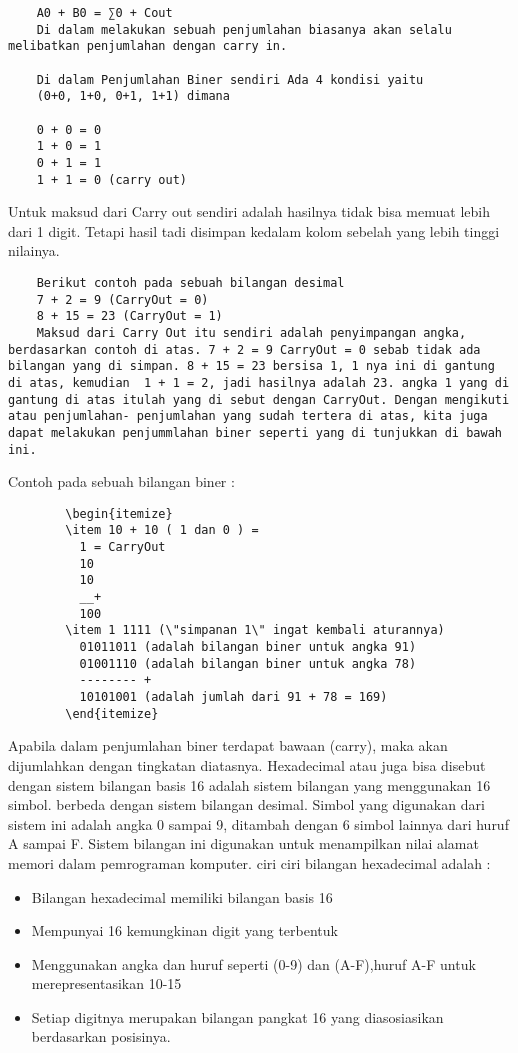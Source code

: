\begin{verbatim}
	A0 + B0 = ∑0 + Cout
	Di dalam melakukan sebuah penjumlahan biasanya akan selalu melibatkan penjumlahan dengan carry in.

	Di dalam Penjumlahan Biner sendiri Ada 4 kondisi yaitu
	(0+0, 1+0, 0+1, 1+1) dimana

	0 + 0 = 0
	1 + 0 = 1
	0 + 1 = 1
	1 + 1 = 0 (carry out) 
\end{verbatim}
	Untuk maksud dari Carry out sendiri adalah hasilnya tidak bisa memuat lebih dari 1 digit. Tetapi  hasil tadi disimpan kedalam kolom sebelah yang lebih tinggi nilainya.
\begin{verbatim}
	Berikut contoh pada sebuah bilangan desimal
	7 + 2 = 9 (CarryOut = 0)
	8 + 15 = 23 (CarryOut = 1)
	Maksud dari Carry Out itu sendiri adalah penyimpangan angka, berdasarkan contoh di atas. 7 + 2 = 9 CarryOut = 0 sebab tidak ada bilangan yang di simpan. 8 + 15 = 23 bersisa 1, 1 nya ini di gantung di atas, kemudian  1 + 1 = 2, jadi hasilnya adalah 23. angka 1 yang di gantung di atas itulah yang di sebut dengan CarryOut. Dengan mengikuti atau penjumlahan- penjumlahan yang sudah tertera di atas, kita juga dapat melakukan penjummlahan biner seperti yang di tunjukkan di bawah ini.
\end{verbatim}
	Contoh pada sebuah bilangan biner :
	\begin{verbatim}
		\begin{itemize}
		\item 10 + 10 ( 1 dan 0 ) =
		  1 = CarryOut
		  10
		  10
		  __+
		  100
		\item 1 1111 (\"simpanan 1\" ingat kembali aturannya)
		  01011011 (adalah bilangan biner untuk angka 91)
		  01001110 (adalah bilangan biner untuk angka 78)
		  -------- +
		  10101001 (adalah jumlah dari 91 + 78 = 169)
		\end{itemize}
	\end{verbatim}

	Apabila dalam penjumlahan biner terdapat bawaan (carry), maka akan dijumlahkan dengan tingkatan diatasnya.
	Hexadecimal atau juga bisa disebut dengan sistem bilangan basis 16 adalah sistem bilangan yang menggunakan 16 simbol. berbeda dengan sistem bilangan desimal. Simbol yang digunakan dari sistem ini adalah angka 0 sampai 9, ditambah dengan 6 simbol lainnya dari huruf A sampai F. Sistem bilangan ini digunakan untuk menampilkan nilai alamat memori dalam pemrograman komputer\cite{nurhayati2010aritmatik}.
	ciri ciri bilangan hexadecimal adalah :

	\begin{itemize}
		\item Bilangan hexadecimal memiliki bilangan basis 16
		\item Mempunyai 16 kemungkinan digit yang terbentuk
		\item Menggunakan angka dan huruf seperti (0-9) dan (A-F),huruf A-F untuk merepresentasikan 10-15
		\item Setiap digitnya merupakan bilangan pangkat 16 yang diasosiasikan berdasarkan posisinya.
	\end{itemize}

